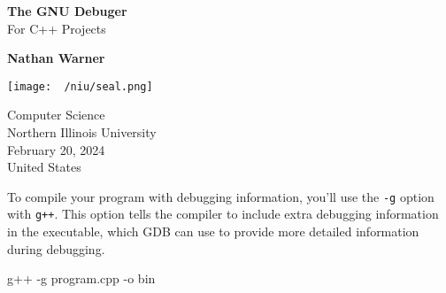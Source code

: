\documentclass{report}
\title{\Huge{}}
\author{\huge{Nathan Warner}}
\date{\huge{}}
\begin{document}
        \begin{titlepage}
       \begin{center}
           \vspace*{1cm}
    
           \textbf{The GNU Debuger} \\
           For C++ Projects
    
           \vspace{0.5cm}
            
                
           \vspace{1.5cm}
    
           \textbf{Nathan Warner}
    
           \vfill
                
                
           \vspace{0.8cm}
         
           \texttt{[image: ~/niu/seal.png]}
                
           Computer Science \\
           Northern Illinois University\\
           February 20, 2024 \\
           United States\\
           
                
       \end{center}
    \end{titlepage}
    \tableofcontents
    \pagebreak 
    \bigbreak \noindent 
    To compile your program with debugging information, you'll use the \texttt{-g} option with \texttt{g++}. This option tells the compiler to include extra debugging information in the executable, which GDB can use to provide more detailed information during debugging.
    \bigbreak \noindent 
    \begin{bashcode}
    g++ -g program.cpp -o bin
    \end{bashcode}
\end{document}
